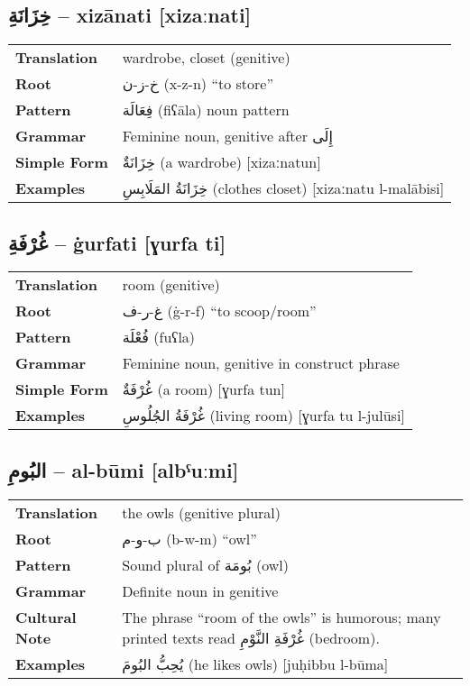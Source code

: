 \documentclass[a4paper,12pt]{article}
\begin{document}
\subsection{\textarabic{خِزَانَةِ} – \textbf{xizānati} [xizaːnati]}
\begin{tabular}{p{3cm}p{10cm}}
\toprule
\textbf{Translation} & wardrobe, closet (genitive)\\
\textbf{Root} & \textarabic{خ-ز-ن} (x-z-n) “to store”\\
\textbf{Pattern} & \textarabic{فِعَالَة} (fiʕāla) noun pattern\\
\textbf{Grammar} & Feminine noun, genitive after \textarabic{إِلَى}\\
\textbf{Simple Form} & \textarabic{خِزَانَةٌ} (a wardrobe) [xizaːnatun]\\
\textbf{Examples} & \textarabic{خِزَانَةُ المَلَابِسِ} (clothes closet) [xizaːnatu l-malābisi]\\
\bottomrule
\end{tabular}

\subsection{\textarabic{غُرْفَةِ} – \textbf{ġurfati} [ɣurfa ti]}
\begin{tabular}{p{3cm}p{10cm}}
\toprule
\textbf{Translation} & room (genitive)\\
\textbf{Root} & \textarabic{غ-ر-ف} (ġ-r-f) “to scoop/room”\\
\textbf{Pattern} & \textarabic{فُعْلَة} (fuʕla)\\
\textbf{Grammar} & Feminine noun, genitive in construct phrase\\
\textbf{Simple Form} & \textarabic{غُرْفَةٌ} (a room) [ɣurfa tun]\\
\textbf{Examples} & \textarabic{غُرْفَةُ الجُلُوسِ} (living room) [ɣurfa tu l-julūsi]\\
\bottomrule
\end{tabular}

\subsection{\textarabic{البُومِ} – \textbf{al-būmi} [albˤuːmi]}
\begin{tabular}{p{3cm}p{10cm}}
\toprule
\textbf{Translation} & the owls (genitive plural)\\
\textbf{Root} & \textarabic{ب-و-م} (b-w-m) “owl”\\
\textbf{Pattern} & Sound plural of \textarabic{بُومَة} (owl)\\
\textbf{Grammar} & Definite noun in genitive\\
\textbf{Cultural Note} & The phrase “room of the owls” is humorous; many printed texts read \textarabic{غُرْفَةِ النَّوْمِ} (bedroom).\\
\textbf{Examples} & \textarabic{يُحِبُّ البُومَ} (he likes owls) [juḥibbu l-būma]\\
\bottomrule
\end{tabular}
\end{document}
